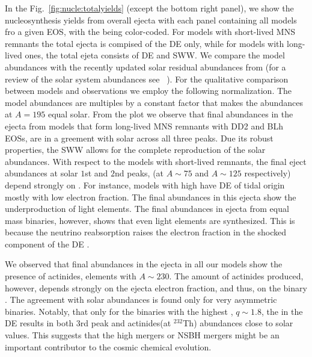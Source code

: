 In the Fig.~\ref{fig:nucle:totalyields} (except the bottom right panel), 
we show the nucleosynthesis yields from overall ejecta with each panel 
containing all models fro a given \ac{EOS}, with the \mr{} being color-coded.
For models with short-lived \ac{MNS} remnants the total ejecta is compised 
of the \ac{DE} only, while for models with long-lived ones, the total ejeta 
consists of \ac{DE} and \ac{SWW}. 
We compare the model abundances with the recently updated solar residual 
\rproc{} abundances from \citet{Prantzos2020} 
(for a review of the solar system abundances see \eg~\citet{Pritychenko:2019xvf}).
For the qualitative comparison between models and observations we employ 
the following normalization. 
The model abundances are multiples by a constant factor that makes the abundances at 
$A=195$ equal solar.
From the plot we observe that final \rproc{} abundances in the ejecta from models that 
form long-lived \ac{MNS} remnants with DD2 and BLh \acp{EOS}, are in a greement with 
solar across all three \rproc{} peaks. 
Due its robust properties, the \ac{SWW} allows for the complete reproduction 
of the solar \rproc{} abundances. 
With respect to the models with short-lived remnants, the final \rproc{} eject abundances 
at solar $1$st and $2$nd \rproc{} peaks, (at $A\sim 75$ and $A\sim 125$ respectively) 
depend strongly on \mr{}. 
For instance, models with high \mr{} have \ac{DE} of tidal origin mostly with low 
electron fraction. The final \rproc{} abundances in this ejecta show the underproduction 
of light elements. 
The final abundances in ejecta from equal mass binaries, 
however, shows that even light \rproc{} elements are 
synthesized. This is because the neutrino reabsorption raises the electron fraction 
in the shocked component of the \ac{DE} \citep{Wanajo:2014wha,Radice:2018pdn}. 

We observed that final abundances in the ejecta in all our models show the 
presence of actinides, elements with $A\sim230$. 
The amount of actinides produced, however, depends strongly on the ejecta 
electron fraction, and thus, on the binary \mr{}.
The agreement with solar abundances is found only for very asymmetric binaries. 
Notably, that only for the binaries with the highest \mr{}, $q\sim1.8$, the 
\rproc{} in the \ac{DE} results in both $3$rd peak and actinides(at $^{232}$Th) abundances 
close to solar values. 
This suggests that the high \mr{} mergers or \ac{NSBH} mergers might be an 
important contributor to the cosmic chemical evolution.

